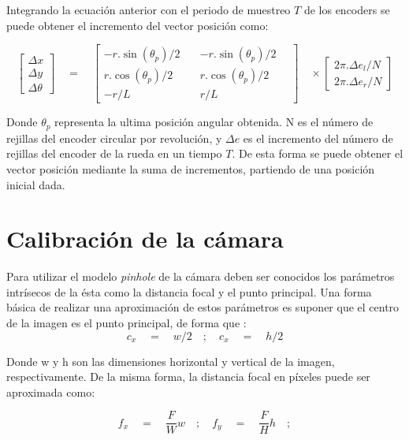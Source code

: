 Integrando la ecuación anterior con el periodo de muestreo $T$ de los encoders se puede obtener el incremento del vector posición como:

\begin{equation}
\label{eq:CineDirectoDelta}
\begin{bmatrix} \Delta x \\ \Delta y \\ \Delta \theta  \end{bmatrix}\quad =\quad \begin{bmatrix} -r.\sin { ({ \theta  }_{ p })/2\quad  }  & -r.\sin { ({ \theta  }_{ p })/2\quad  }  \\ r.\cos { ({ \theta  }_{ p })/2 }  & r.\cos { ({ \theta  }_{ p })/2 }  \\ -r/L & r/L \end{bmatrix}\quad \times \begin{bmatrix} { 2\pi .\Delta e }_{ l }/N \\ { 2\pi .\Delta e }_{ r }/N \end{bmatrix}
\end{equation}

Donde ${ \theta  }_{ p }$ representa la ultima posición angular obtenida. N es el número de rejillas del encoder circular por revolución, y $\Delta e$ es el incremento del número de rejillas del encoder de la rueda en un tiempo $T$. De esta forma se puede obtener el vector posición mediante la suma de incrementos, partiendo de una posición inicial dada.


\section{Calibración de la cámara}

Para utilizar el modelo \textit{pinhole} de la cámara deben ser conocidos los parámetros intrísecos de la ésta como la distancia focal y el punto principal. Una forma básica de realizar una aproximación de estos parámetros es suponer que el centro de la imagen es el punto principal, de forma que :
\begin{equation}
{ c }_{ x }\quad =\quad w/2\quad ;\quad { c }_{ x }\quad =\quad h/2
\end{equation}

Donde w y h son las dimensiones horizontal y vertical de la imagen, respectivamente. De la misma forma, la distancia focal en píxeles puede ser aproximada como:

\begin{equation}
	{ f }_{ x }\quad =\quad \frac { F }{ W } w\quad ;\quad { f }_{ y }\quad =\quad \frac { F }{ H } h\quad ;
\end{equation}


